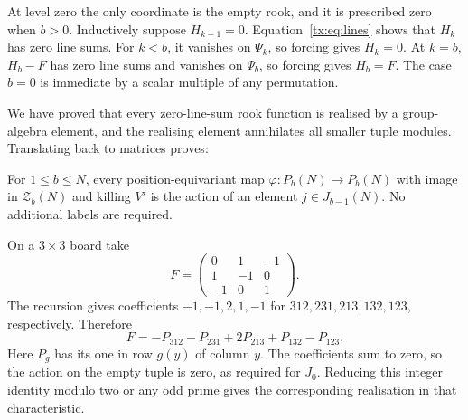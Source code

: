 At level zero the only coordinate is the empty rook, and it is prescribed zero when $b>0$. Inductively suppose $H_{k-1}=0$. Equation~\eqref{tx:eq:lines} shows that $H_k$ has zero line sums. For $k<b$, it vanishes on $\Psi_k$, so forcing gives $H_k=0$. At $k=b$, $H_b-F$ has zero line sums and vanishes on $\Psi_b$, so forcing gives $H_b=F$. The case $b=0$ is immediate by a scalar multiple of any permutation.

We have proved that every zero-line-sum rook function is realised by a group-algebra element, and the realising element annihilates all smaller tuple modules. Translating back to matrices proves:
\begin{theorem}\label{tx:thm:realization}
For $1\le b\le N$, every position-equivariant map $\varphi:P_b(N)\to P_b(N)$ with image in $\mathcal Z_b(N)$ and killing $V'$ is the action of an element $j\in J_{b-1}(N)$. No additional labels are required.
\end{theorem}

\begin{example}
On a $3\times3$ board take
\[F=\begin{pmatrix}0&1&-1\\1&-1&0\\-1&0&1\end{pmatrix}.
\]
The recursion gives coefficients $-1,-1,2,1,-1$ for $312,231,213,132,123$, respectively. Therefore
\[F=-P_{312}-P_{231}+2P_{213}+P_{132}-P_{123}.
\]
Here $P_g$ has its one in row $g(y)$ of column $y$. The coefficients sum to zero, so the action on the empty tuple is zero, as required for $J_0$. Reducing this integer identity modulo two or any odd prime gives the corresponding realisation in that characteristic.
\end{example}

